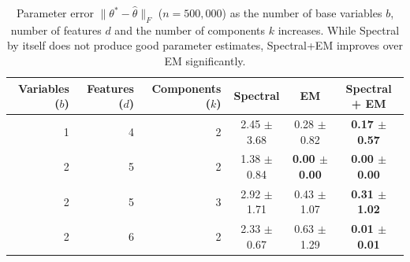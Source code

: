 
\begin{table}[tbhp]
\caption{Parameter error $\|\theta^* - \hat \theta\|_F$ ($n = 500,000$)
as the number of base variables $b$, number of features $d$ and the number of components $k$ increases.
While Spectral by itself does not produce good parameter estimates, Spectral+EM improves
over EM significantly.
}
\label{tbl:parameter-recovery}
\vskip 0.15in
\begin{center}
\begin{small}
\begin{sc}

  \begin{tabular}{ r r r c c c }
\hline
\abovespace\belowspace
Variables ($b$) & Features ($d$) & Components ($k$) & Spectral & EM & Spectral + EM \\
\hline
\abovespace
  1 & 4 & 2 & 2.45 $\pm$ 3.68 & 0.28 $\pm$ 0.82 & {\bf 0.17 $\pm$ 0.57} \\
2 & 5 & 2 & 1.38 $\pm$ 0.84 & {\bf 0.00 $\pm$ 0.00} & {\bf 0.00 $\pm$ 0.00} \\
  2 & 5 & 3 & 2.92 $\pm$ 1.71 & 0.43 $\pm$ 1.07 & {\bf 0.31 $\pm$ 1.02} \\
  2 & 6 & 2 & 2.33 $\pm$ 0.67 & 0.63 $\pm$ 1.29 & {\bf 0.01 $\pm$ 0.01} \\



\end{tabular}
\end{sc}
\end{small}
\end{center}
\end{table}
